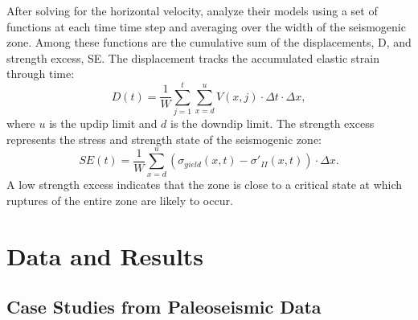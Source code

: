 \documentclass[]{proposalnsf}
\begin{document}
After solving for the horizontal velocity, \citet{Herrendorfer2015} analyze their models using a set of functions at each time time step and averaging over the width of the seismogenic zone. Among these functions are the cumulative sum of the displacements, D, and strength excess, SE. The displacement tracks the accumulated elastic strain through time:
%
\begin{equation}
D(t) = \frac{1}{W} \sum_{j=1}^t \sum_{x=d}^u V(x,j)\cdot \Delta t \cdot \Delta x,	
\end{equation}
where $u$ is the updip limit and $d$ is the downdip limit. The strength excess represents the stress and strength state of the seismogenic zone:
\begin{equation}
	SE(t) = \frac{1}{W}\sum_{x=d}^u (\sigma_{yield}(x,t) - \sigma '_{II}(x,t)) \cdot \Delta x.
\end{equation}
 A low strength excess indicates that the zone is close to a critical state at which ruptures of the entire zone are likely to occur.

\section{Data and Results}

\subsection{Case Studies from Paleoseismic Data}
\end{document}
